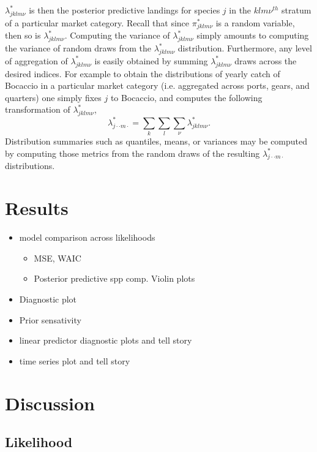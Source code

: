 \documentclass[12pt]{article}
\begin{document}
%
$\lambda^*_{jklm\nu}$ is then the posterior predictive landings for
species \(j\) in the \(klm\nu^{th}\) stratum of a particular market
category. Recall that since \(\pi^*_{jklm\nu}\) is a random variable,
then so is \(\lambda^*_{jklm\nu}\). Computing the variance of
\(\lambda^*_{jklm\nu}\) simply amounts to computing the variance of
random draws from the \(\lambda^*_{jklm\nu}\) distribution.
Furthermore, any level of aggregation of \(\lambda^*_{jklm\nu}\) is
easily obtained by summing \(\lambda^*_{jklm\nu}\) draws across the
desired indices. For example to obtain the distributions of yearly catch
of Bocaccio in a particular market category (i.e. aggregated across ports, 
gears, and quarters) one simply fixes $j$ to Bocaccio, and computes the 
following transformation of \(\lambda^*_{jklm\nu}\),
%
\[\lambda^*_{j\cdot\cdot m\cdot} =\sum_{k}\sum_{l}\sum_{\nu}\lambda^*_{jklm\nu}.\]
%
Distribution summaries such as quantiles, means, or variances may be
computed by computing those metrics from the random draws of the
resulting \(\lambda^*_{j\cdot\cdot m\cdot}\) distributions.

%
%
\section{Results}\label{results}
%
%

%
\begin{itemize}
\item model comparison across likelihoods 
	\begin{itemize}
	\item MSE, WAIC
	\item Posterior predictive spp comp. Violin plots
	\end{itemize}
\item Diagnostic plot
\item Prior sensativity
\item linear predictor diagnostic plots and tell story
\item time series plot and tell story
\end{itemize}

%
%
\section{Discussion}\label{discussion}
%
%

%
%
\subsection{Likelihood}\label{likeDiscussion}
%
%
\end{document}
